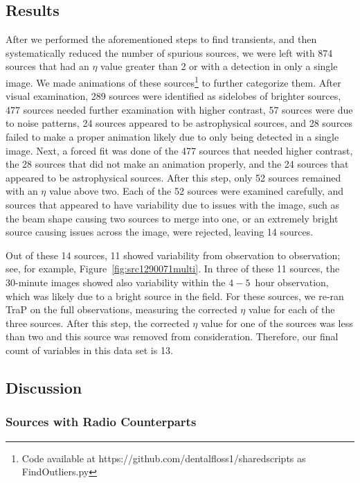 \documentclass[12pt]{article}
\begin{document}
\subsection{Results}
\label{sec:results3}

After we performed the aforementioned steps to find transients, and then systematically reduced the number of spurious sources, we were left with 874 sources that had an $\eta$ value greater than 2 or with a detection in only a single image. We made animations of these sources\footnote{Code available at https://github.com/dentalfloss1/sharedscripts as FindOutliers.py} to further categorize them. After visual examination, 289 sources were identified as sidelobes of brighter sources, 477 sources needed further examination with higher contrast, 57 sources were due to noise patterns, 24 sources appeared to be astrophysical sources, and 28 sources failed to make a proper animation likely due to only being detected in a single image. Next, a forced fit was done of the 477 sources that needed higher contrast, the 28 sources that did not make an animation properly, and the 24 sources that appeared to be astrophysical sources. After this step, only 52 sources remained with an $\eta$ value above two. Each of the 52 sources were examined carefully, and sources that appeared to have variability due to issues with the image, such as the beam shape causing two sources to merge into one, or an extremely bright source causing issues across the image, were rejected, leaving 14 sources. 

Out of these 14 sources, 11 showed variability from observation to observation; see, for example, Figure~\ref{fig:src1290071multi}. In three of these 11 sources, the 30-minute images showed also variability within the $4-5$~hour observation, which was likely due to a bright source in the field. For these sources, we re-ran TraP on the full observations, measuring the corrected $\eta$ value for each of the three sources. After this step, the corrected $\eta$ value for one of the sources was less than two and this source was removed from consideration. Therefore, our final count of variables in this data set is 13.




\subsection{Discussion}
\label{sec:discussion3}
\subsubsection{Sources with Radio Counterparts}
\end{document}
